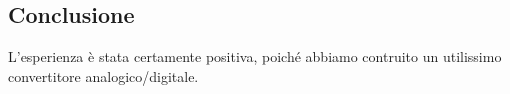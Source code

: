 \subsection{Conclusione}

L'esperienza è stata certamente positiva, poiché abbiamo contruito un utilissimo convertitore analogico/digitale.
